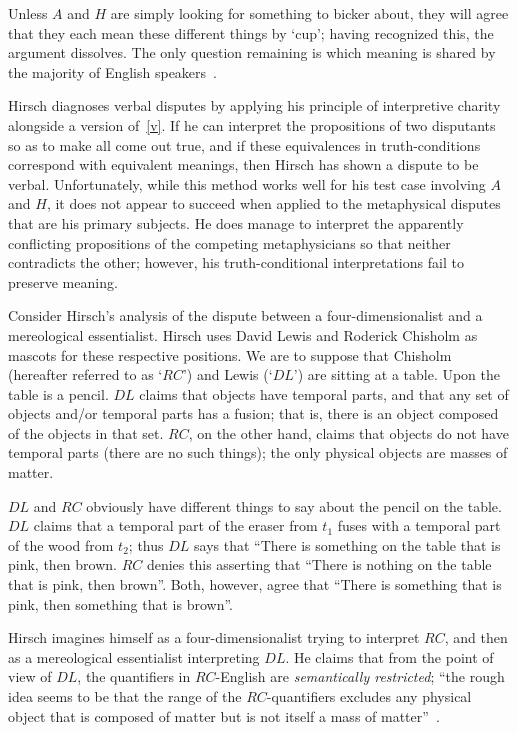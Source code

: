 \documentclass[11pt]{article}
\begin{document}
\begin{spacing}{1.25}
Unless $A$ and $H$ are simply looking for something to bicker about,
they will agree that they each mean these different things by `cup';
having recognized this, the argument dissolves.  The only question
remaining is which meaning is shared by the majority of English
speakers~\citep[70]{hirsch2005}.

Hirsch diagnoses verbal disputes by applying his principle of
interpretive charity alongside a version of~\ref{v}.  If he can
interpret the propositions of two disputants so as to make all come
out true, and if these equivalences in truth-conditions correspond
with equivalent meanings, then Hirsch has shown a dispute to be
verbal.  Unfortunately, while this method works well for his test case
involving $A$ and $H$, it does not appear to succeed when applied to
the metaphysical disputes that are his primary subjects.  He does
manage to interpret the apparently conflicting propositions of the
competing metaphysicians so that neither contradicts the other;
however, his truth-conditional interpretations fail to preserve
meaning.

Consider Hirsch's analysis of the dispute between a
four-dimensionalist and a mereological essentialist.  Hirsch uses
David Lewis and Roderick Chisholm as mascots for these respective
positions.  We are to suppose that Chisholm (hereafter referred to as
`$RC$') and Lewis (`$DL$') are sitting at a table.  Upon the table is
a pencil. $DL$ claims that objects have temporal parts, and that any
set of objects and/or temporal parts has a fusion; that is, there is
an object composed of the objects in that set.  $RC$, on the other
hand, claims that objects do not have temporal parts (there are no
such things); the only physical objects are masses of matter.

$DL$ and $RC$ obviously have different things to say about the pencil
on the table.  $DL$ claims that a temporal part of the eraser from
$t_{1}$ fuses with a temporal part of the wood from $t_{2}$; thus $DL$
says that ``There is something on the table that is pink, then brown.
$RC$ denies this asserting that ``There is nothing on the table that
is pink, then brown''.  Both, however, agree that ``There is something
that is pink, then something that is brown''.

Hirsch imagines himself as a four-dimensionalist trying to interpret
$RC$, and then as a mereological essentialist interpreting $DL$.  He
claims that from the point of view of $DL$, the quantifiers in
$RC$-English are {\em semantically restricted}; ``the rough idea seems
to be that the range of the $RC$-quantifiers excludes any physical
object that is composed of matter but is not itself a mass of
matter''~\citep[76]{hirsch2005}.


\end{spacing}
\end{document}
